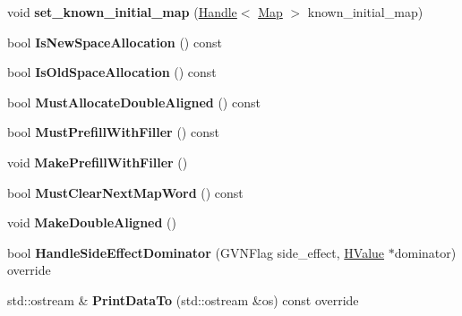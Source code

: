 \begin{DoxyCompactItemize}
\item 
void {\bfseries set\+\_\+known\+\_\+initial\+\_\+map} (\hyperlink{classv8_1_1internal_1_1_handle}{Handle}$<$ \hyperlink{classv8_1_1internal_1_1_map}{Map} $>$ known\+\_\+initial\+\_\+map)\hypertarget{classv8_1_1internal_1_1_h_allocate_a47276171240023608e953f6278274e9f}{}\label{classv8_1_1internal_1_1_h_allocate_a47276171240023608e953f6278274e9f}

\item 
bool {\bfseries Is\+New\+Space\+Allocation} () const \hypertarget{classv8_1_1internal_1_1_h_allocate_ab4534cf0542c5c0bc187416d10802e91}{}\label{classv8_1_1internal_1_1_h_allocate_ab4534cf0542c5c0bc187416d10802e91}

\item 
bool {\bfseries Is\+Old\+Space\+Allocation} () const \hypertarget{classv8_1_1internal_1_1_h_allocate_a200f413ad90915f427be92337be06c46}{}\label{classv8_1_1internal_1_1_h_allocate_a200f413ad90915f427be92337be06c46}

\item 
bool {\bfseries Must\+Allocate\+Double\+Aligned} () const \hypertarget{classv8_1_1internal_1_1_h_allocate_aea1e5682c4b81ccf6c8e84dc72882001}{}\label{classv8_1_1internal_1_1_h_allocate_aea1e5682c4b81ccf6c8e84dc72882001}

\item 
bool {\bfseries Must\+Prefill\+With\+Filler} () const \hypertarget{classv8_1_1internal_1_1_h_allocate_a8896e81f2ba7cc2c80dc0eb99be96df3}{}\label{classv8_1_1internal_1_1_h_allocate_a8896e81f2ba7cc2c80dc0eb99be96df3}

\item 
void {\bfseries Make\+Prefill\+With\+Filler} ()\hypertarget{classv8_1_1internal_1_1_h_allocate_a0eb4a6a531782a6603293fe15f25807f}{}\label{classv8_1_1internal_1_1_h_allocate_a0eb4a6a531782a6603293fe15f25807f}

\item 
bool {\bfseries Must\+Clear\+Next\+Map\+Word} () const \hypertarget{classv8_1_1internal_1_1_h_allocate_ac9ab688f331d450ef8a774a53126396d}{}\label{classv8_1_1internal_1_1_h_allocate_ac9ab688f331d450ef8a774a53126396d}

\item 
void {\bfseries Make\+Double\+Aligned} ()\hypertarget{classv8_1_1internal_1_1_h_allocate_a4118f2cbafd4e324ab7bbe1ec59dfb16}{}\label{classv8_1_1internal_1_1_h_allocate_a4118f2cbafd4e324ab7bbe1ec59dfb16}

\item 
bool {\bfseries Handle\+Side\+Effect\+Dominator} (G\+V\+N\+Flag side\+\_\+effect, \hyperlink{classv8_1_1internal_1_1_h_value}{H\+Value} $\ast$dominator) override\hypertarget{classv8_1_1internal_1_1_h_allocate_a42d136e4394e4281376666d5db5824ca}{}\label{classv8_1_1internal_1_1_h_allocate_a42d136e4394e4281376666d5db5824ca}

\item 
std\+::ostream \& {\bfseries Print\+Data\+To} (std\+::ostream \&os) const  override\hypertarget{classv8_1_1internal_1_1_h_allocate_a9b0790a73ad2194411e84c364f65e0a0}{}\label{classv8_1_1internal_1_1_h_allocate_a9b0790a73ad2194411e84c364f65e0a0}

\end{DoxyCompactItemize}
